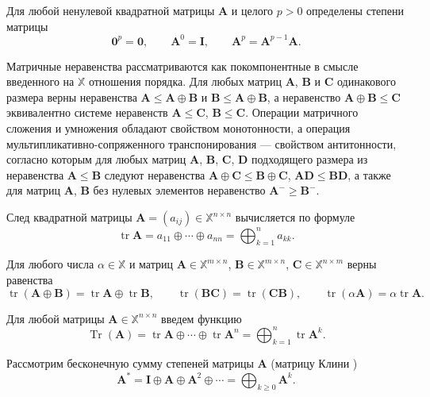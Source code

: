 \documentclass[specialist,
               substylefile = spbu.rtx,
               subf,href,colorlinks=true, 12pt]{disser}
\DeclareMathOperator{\tr}{tr}
\DeclareMathOperator{\Tr}{Tr}
\theoremstyle{definition}
\begin{document}
Для любой ненулевой квадратной матрицы $\bm{A}$ и целого $p>0$ определены степени матрицы 
\begin{equation*}
\bm{0}^{p}
=
\bm{0},
\qquad
\bm{A}^{0}=\bm{I}, 
\qquad
\bm{A}^{p}=\bm{A}^{p-1}\bm{A}.
\end{equation*}

Матричные неравенства рассматриваются как покомпонентные в смысле введенного на $\mathbb{X}$ отношения порядка.
Для любых матриц $\bm{A}$, $\bm{B}$ и $\bm{C}$ одинакового размера
верны неравенства $\bm{A}\leq\bm{A}\oplus\bm{B}$ и $\bm{B}\leq\bm{A}\oplus\bm{B}$, а неравенство $\bm{A}\oplus\bm{B}\leq\bm{C}$ эквивалентно системе неравенств $\bm{A}\leq\bm{C}$, $\bm{B}\leq\bm{C}$.
Операции матричного сложения и умножения обладают свойством монотонности, а операция  мультипликативно-сопряженного транспонирования --- свойством антитонности, согласно которым для любых матриц $\bm{A}$, $\bm{B}$, $\bm{C}$, $\bm{D}$ подходящего размера из неравенства $\bm{A}\leq\bm{B}$ следуют неравенства $\bm{A}\oplus\bm{C}\leq\bm{B}\oplus\bm{C}$, $\bm{A}\bm{D}\leq\bm{B}\bm{D}$,
а также для матриц $\bm{A}$, $\bm{B}$ без нулевых элементов неравенство $\bm{A}^{-}\geq\bm{B}^{-}$.

След квадратной матрицы $\bm{A}=(a_{ij})\in\mathbb{X}^{n\times n}$ вычисляется по формуле 
\begin{equation*}
\tr\bm{A}=a_{11}\oplus\cdots\oplus a_{nn}
=
\bigoplus_{k=1}^{n}a_{kk}.
\end{equation*}

Для любого числа $\alpha\in\mathbb{X}$ и матриц $\bm{A}\in\mathbb{X}^{m\times n}$, $\bm{B}\in\mathbb{X}^{m\times n}$, $\bm{C}\in\mathbb{X}^{n\times m}$ верны равенства
\begin{equation*}
\tr(\bm{A}\oplus\bm{B})
=
\tr\bm{A}
\oplus
\tr\bm{B},
\qquad
\tr(\bm{B}\bm{C})=\tr(\bm{C}\bm{B}),
\qquad
\tr(\alpha\bm{A})=\alpha\tr\bm{A}.
\end{equation*}

Для любой матрицы $\bm{A}\in\mathbb{X}^{n\times n}$ введем функцию
\begin{equation*}
\Tr(\bm{A})=\tr\bm{A}\oplus\cdots\oplus\tr\bm{A}^{n}
=
\bigoplus_{k=1}^{n}\tr\bm{A}^{k}.
\end{equation*}

Рассмотрим бесконечную сумму степеней матрицы $\bm{A}$ (матрицу Клини \cite{Kleene1956Representation})
\begin{equation*}
\bm{A}^{\ast}
=
\bm{I}\oplus\bm{A}\oplus\bm{A}^{2}\oplus\cdots
=
\bigoplus_{k\geq 0}\bm{A}^{k}.
\end{equation*}
\end{document}
